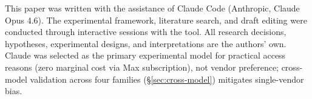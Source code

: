 \documentclass[11pt]{article}
\begin{document}
This paper was written with the assistance of Claude Code (Anthropic, Claude Opus 4.6). The experimental framework, literature search, and draft editing were conducted through interactive sessions with the tool. All research decisions, hypotheses, experimental designs, and interpretations are the authors' own. Claude was selected as the primary experimental model for practical access reasons (zero marginal cost via Max subscription), not vendor preference; cross-model validation across four families (\S\ref{sec:cross-model}) mitigates single-vendor bias.


\end{document}
